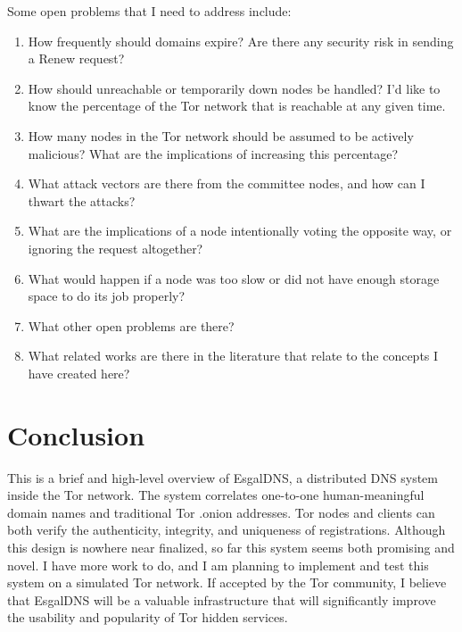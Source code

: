 \documentclass[journal]{IEEEtran}
\begin{document}
Some open problems that I need to address include:

\begin{enumerate}
	\item How frequently should domains expire? Are there any security risk in sending a Renew request?
	\item How should unreachable or temporarily down nodes be handled? I'd like to know the percentage of the Tor network that is reachable at any given time.
	\item How many nodes in the Tor network should be assumed to be actively malicious? What are the implications of increasing this percentage?
	\item What attack vectors are there from the committee nodes, and how can I thwart the attacks?
	\item What are the implications of a node intentionally voting the opposite way, or ignoring the request altogether?
	\item What would happen if a node was too slow or did not have enough storage space to do its job properly?
	\item What other open problems are there?
	\item What related works are there in the literature that relate to the concepts I have created here?
\end{enumerate}

\section{Conclusion}

This is a brief and high-level overview of EsgalDNS, a distributed DNS system inside the Tor network. The system correlates one-to-one human-meaningful domain names and traditional Tor .onion addresses. Tor nodes and clients can both verify the authenticity, integrity, and uniqueness of registrations. Although this design is nowhere near finalized, so far this system seems both promising and novel. I have more work to do, and I am planning to implement and test this system on a simulated Tor network. If accepted by the Tor community, I believe that EsgalDNS will be a valuable infrastructure that will significantly improve the usability and popularity of Tor hidden services.



\end{document}
